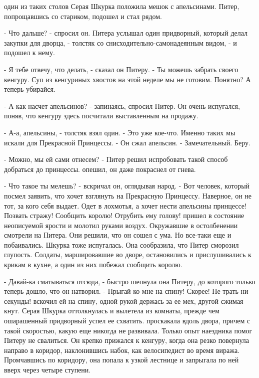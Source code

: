  один из таких столов Серая Шкурка положила мешок с апельсинами. 
Питер, попрощавшись со стариком, подошел и стал рядом.
\par- Что дальше? - спросил он.
 Питера услышал один придворный, который делал закупки для 
дворца, - толстяк со снисходительно-самонадеянным видом, - и подошел к 
нему.
\par- Я тебе отвечу, что делать, - сказал он Питеру. - Ты можешь 
забрать своего кенгуру. Суп из кенгуриных хвостов на этой неделе мы не 
готовим. Понятно? А теперь убирайся.
\par- А как насчет апельсинов? - запинаясь, спросил Питер. Он очень 
испугался, поняв, что кенгуру здесь посчитали выставленным на продажу.
\par- А-а, апельсины, - толстяк взял один. - Это уже кое-что. Именно 
таких мы искали для Прекрасной Принцессы. - Он сжал апельсин. - 
Замечательный. Беру.
\par- Можно, мы ей сами отнесем? - Питер решил испробовать такой 
способ добраться до принцессы.
 опешил, он даже покраснел от гнева.
\par- Что такое ты мелешь? - вскричал он, оглядывая народ. - Вот 
человек, который посмел заявить, что хочет взглянуть на Прекрасную 
Принцессу. Наверное, он не тот, за кого себя выдает. Одет в лохмотья, 
а хочет нести апельсины принцессе! Позвать стражу! Сообщить королю! 
Отрубить ему голову!
 пришел в состояние неописуемой ярости и молотил руками воздух. 
Окружавшие в остолбенении смотрели на Питера. Они решили, что он сошел 
с ума. Но все-таки еще и побаивались.
 Шкурка тоже испугалась. Она сообразила, что Питер сморозил 
глупость. Солдаты, маршировавшие во дворе, остановились и 
прислушивались к крикам в кухне, а один из них побежал сообщить 
королю.
\par- Давай-ка сматываться отсюда, - быстро шепнула она Питеру, до 
которого только теперь дошло, что он натворил. - Прыгай ко мне на 
спину! Скорее! Не трать ни секунды!
 вскочил ей на спину, одной рукой держась за ее мех, другой 
сжимая кнут. Серая Шкурка оттолкнулась и вылетела из комнаты, прежде 
чем ошарашенный придворный успел ее схватить.
 проскакала вдоль двора, причем с такой скоростью, какую еще 
никогда не развивала. Только опыт наездника помог Питеру не свалиться. 
Он крепко прижался к кенгуру, когда она резко повернула направо в 
коридор, наклонившись набок, как велосипедист во время виража. 
Промчавшись по коридору, она попала к узкой лестнице и запрыгала по 
ней вверх через четыре ступени.
